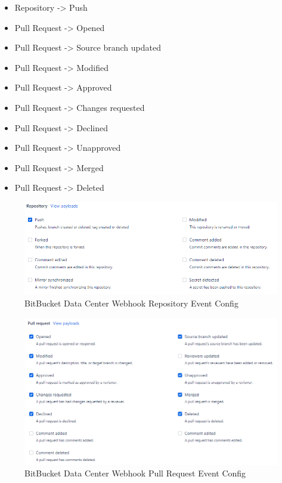 \begin{itemize}
    \item Repository -> Push
    \item Pull Request -> Opened
    \item Pull Request -> Source branch updated
    \item Pull Request -> Modified
    \item Pull Request -> Approved
    \item Pull Request -> Changes requested
    \item Pull Request -> Declined
    \item Pull Request -> Unapproved
    \item Pull Request -> Merged
    \item Pull Request -> Deleted
\end{itemize}


\begin{figure}[ht]
    \includegraphics[width=\textwidth]{graphics/bbdc-repository-event-config.png}
    \caption{BitBucket Data Center Webhook Repository Event Config}
    \label{fig:bbdc-repo-event-config}
\end{figure}

\begin{figure}[ht]
    \includegraphics[width=\textwidth]{graphics/bbdc-pr-event-config.png}
    \caption{BitBucket Data Center Webhook Pull Request Event Config}
    \label{fig:bbdc-pr-event-config}
\end{figure}


